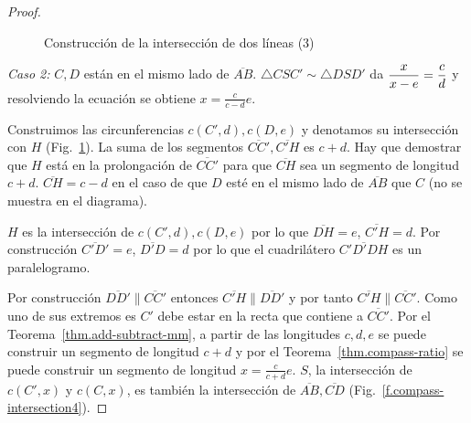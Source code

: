 \begin{proof}
\begin{figure}
\begin{center}
\end{center}
\caption{Construcción de la intersección de dos líneas (3)}\label{f.compass-intersection3}
\end{figure}


\textit{Caso 2:}
$C,D$ están en el mismo lado de $\overline{AB}$. $\triangle CSC'\sim\triangle DSD'$ da $\displaystyle\frac{x}{x-e}=\frac{c}{d}\displaystyle$ y resolviendo la ecuación se obtiene $x=\displaystyle\frac{c}{c-d}e$.

Construimos las circunferencias $c(C',d), c(D,e)$ y denotamos su intersección con $H$ (Fig.~\ref{f.compass-intersection3}). La suma de los segmentos $\overline{CC'}, \overline{C'H}$ es $c + d$. Hay que demostrar que $H$ está en la prolongación de $\overline{CC'}$ para que $\overline{CH}$ sea un segmento de longitud $c+d$. $\overline{CH} = c - d$ en el caso de que $D$ esté en el mismo lado de $\overline{AB}$ que $C$ (no se muestra en el diagrama).

$H$ es la intersección de $c(C',d), c(D,e)$ por lo que $\overline{DH}=e$, $\overline{C'H}=d$. Por construcción $\overline{C'D'} = e$, $\overline{D'D}=d$ por lo que el cuadrilátero $\overline{C'D'DH}$ es un paralelogramo. 

Por construcción $\overline{DD'}\parallel\overline{CC'}$ entonces $\overline{C'H}\parallel \overline{DD'}$ y por tanto $\overline{C'H}\parallel\overline{CC'}$. Como uno de sus extremos es $C'$ debe estar en la recta que contiene a $\overline{CC'}$. Por el Teorema~\ref{thm.add-subtract-mm}, a partir de las longitudes $c,d,e$ se puede construir un segmento de longitud $c+d$ y por el Teorema~\ref{thm.compass-ratio} se puede construir un segmento de longitud $x=\displaystyle\frac{c}{c+d}e$. $S$, la intersección de $c(C',x)$ y $c(C,x)$, es también la intersección de $\overline{AB}, \overline{CD}$ (Fig.~\ref{f.compass-intersection4}).
\end{proof}

